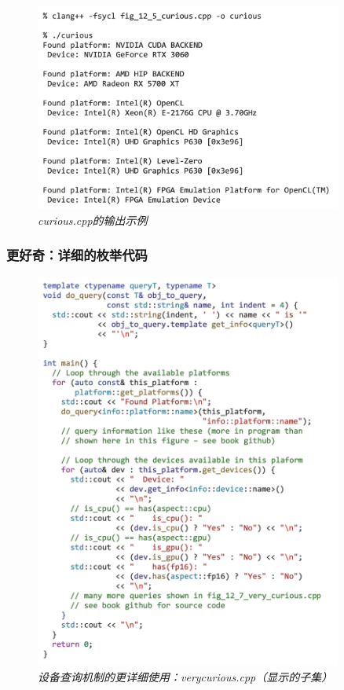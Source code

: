 \begin{figure}[H]
	\centering
	\includegraphics[width=0.9\textwidth]{figs/F12.6.png}
	\caption{\textit{curious.cpp的输出示例 }}
\end{figure}

\subsubsection{更好奇：详细的枚举代码}
\begin{figure}[H]
	\centering
	\includegraphics[width=0.9\textwidth]{figs/F12.7.png}
	\caption{\textit{设备查询机制的更详细使用：verycurious.cpp（显示的子集） }}
\end{figure}

